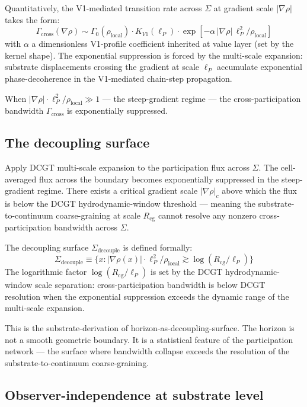 \documentclass[11pt,a4paper]{article}
\begin{document}
Quantitatively, the V1-mediated transition rate across $\Sigma$ at gradient scale $|\nabla\rho|$ takes the form:
\[
\Gamma_{\mathrm{cross}}(\nabla\rho) \sim \Gamma_0(\rho_{\mathrm{local}}) \cdot K_{V1}(\ell_P) \cdot \exp\!\left[-\alpha\, |\nabla\rho|\, \ell_P^{2} / \rho_{\mathrm{local}}\right]
\]
with $\alpha$ a dimensionless V1-profile coefficient inherited at value layer (set by the kernel shape). The exponential suppression is forced by the multi-scale expansion: substrate displacements crossing the gradient at scale $\ell_P$ accumulate exponential phase-decoherence in the V1-mediated chain-step propagation.

When $|\nabla\rho|\cdot\ell_P^2/\rho_{\mathrm{local}} \gg 1$ --- the steep-gradient regime --- the cross-participation bandwidth $\Gamma_{\mathrm{cross}}$ is exponentially suppressed.

\subsection{The decoupling surface}

Apply DCGT multi-scale expansion to the participation flux across $\Sigma$. The cell-averaged flux across the boundary becomes exponentially suppressed in the steep-gradient regime. There exists a critical gradient scale $|\nabla\rho|_c$ above which the flux is below the DCGT hydrodynamic-window threshold --- meaning the substrate-to-continuum coarse-graining at scale $R_{\mathrm{cg}}$ cannot resolve any nonzero cross-participation bandwidth across $\Sigma$.

The decoupling surface $\Sigma_{\mathrm{decouple}}$ is defined formally:
\[
\Sigma_{\mathrm{decouple}} \equiv \{x : |\nabla\rho(x)| \cdot \ell_P^{2} / \rho_{\mathrm{local}} \gtrsim \log(R_{\mathrm{cg}}/\ell_P)\}
\]
The logarithmic factor $\log(R_{\mathrm{cg}}/\ell_P)$ is set by the DCGT hydrodynamic-window scale separation: cross-participation bandwidth is below DCGT resolution when the exponential suppression exceeds the dynamic range of the multi-scale expansion.

This is the substrate-derivation of horizon-as-decoupling-surface. The horizon is not a smooth geometric boundary. It is a statistical feature of the participation network --- the surface where bandwidth collapse exceeds the resolution of the substrate-to-continuum coarse-graining.

\subsection{Observer-independence at substrate level}
\end{document}
